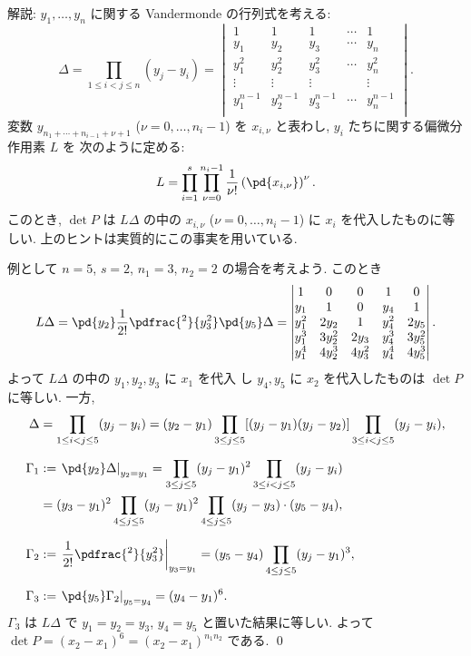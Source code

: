 \documentclass[12pt,twoside]{jarticle}
\begin{document}
\medskip
\noindent
解説: $y_1,\dots,y_n$ に関する Vandermonde の行列式を考える:
\begin{equation*}
  \Delta = \prod_{1\le i<j\le n}(y_j-y_i) =
  \begin{vmatrix}
    1         & 1         & 1         & \cdots & 1 \\
    y_1       & y_2       & y_3       & \cdots & y_n \\
    y_1^2     & y_2^2     & y_3^2     & \cdots & y_n^2 \\
    \vdots    & \vdots    & \vdots    &        & \vdots \\
    y_1^{n-1} & y_2^{n-1} & y_3^{n-1} & \cdots & y_n^{n-1} \\
  \end{vmatrix}.
\end{equation*}
変数 $y_{n_1+\cdots+n_{i-1}+\nu+1}$ ($\nu=0,\dots,n_i-1$)
を $x_{i,\nu}$ と表わし, $y_i$ たちに関する偏微分作用素 $L$ を
次のように定める:
\begin{equation*}
  L = 
  \prod_{i=1}^s \prod_{\nu=0}^{n_i-1}
  \frac{1}{\nu!}\left(\pd{x_{i,\nu}}\right)^\nu.
\end{equation*}
このとき, $\det P$ は $L\Delta$ の中の $x_{i,\nu}$ 
($\nu=0,\dots,n_i-1$) に $x_i$ を代入したものに等しい.
上のヒントは実質的にこの事実を用いている.

例として $n=5$, $s=2$, $n_1=3$, $n_2=2$ の場合を考えよう. 
このとき
\begin{equation*}
  L\Delta = 
  \pd{y_2}\frac{1}{2!}\pdfrac{^2}{y_3^2}\pd{y_5}\Delta = 
  \begin{vmatrix}
    1     & 0      & 0      & 1     & 0      \\
    y_1   & 1      & 0      & y_4   & 1      \\
    y_1^2 & 2y_2   & 1      & y_4^2 & 2y_5   \\
    y_1^3 & 3y_2^2 & 2y_3   & y_4^3 & 3y_5^2 \\
    y_1^4 & 4y_2^3 & 4y_3^2 & y_4^4 & 4y_5^3 \\
  \end{vmatrix}.
\end{equation*}
よって $L\Delta$ の中の $y_1,y_2,y_3$ に $x_1$ を代入
し $y_4,y_5$ に $x_2$ を代入したものは $\det P$ に等しい. 一方, 
\begin{align*}
  \Delta 
  &
  = \prod_{1\le i<j\le 5}(y_j-y_i)
  = (y_2-y_1)\prod_{3\le j\le 5}[(y_j-y_1)(y_j-y_2)]
    \prod_{3\le i<j\le 5}(y_j-y_i),
  \\[\medskipamount]
  \Gamma_1 
  &
  := \left. \pd{y_2}\Delta \right|_{y_2=y_1} 
  = \prod_{3\le j\le 5}(y_j-y_1)^2
    \prod_{3\le i<j\le 5}(y_j-y_i)
  \\ &
  = (y_3-y_1)^2 \prod_{4\le j\le 5}(y_j-y_1)^2\prod_{4\le j\le 5}(y_j-y_3)
  \cdot(y_5-y_4),
  \\[\medskipamount]
  \Gamma_2
  &
  := \left. \frac{1}{2!}\pdfrac{^2}{y_3^2} \right|_{y_3=y_1}
  = (y_5-y_4)\prod_{4\le j\le 5}(y_j-y_1)^3,
  \\[\medskipamount]
  \Gamma_3
  &
  := \left. \pd{y_5}\Gamma_2 \right|_{y_5=y_4}
  = (y_4-y_1)^6.
\end{align*}
$\Gamma_3$ は $L\Delta$ で $y_1=y_2=y_3$, $y_4=y_5$ と置いた結果に等しい.
よって $\det P = (x_2-x_1)^6=(x_2-x_1)^{n_1n_2}$ である.
\qed
\end{document}
